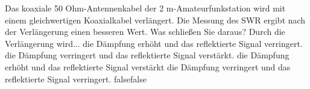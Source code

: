     {Das koaxiale 50 Ohm-Antennenkabel der 2 m-Amateurfunkstation wird mit einem gleichwertigen Koaxialkabel verlängert. Die Messung des SWR ergibt nach der Verlängerung einen besseren Wert. Was schließen Sie daraus? Durch die Verlängerung wird...}
    {die Dämpfung erhöht und das reflektierte Signal verringert.}
    {die Dämpfung verringert und das reflektierte Signal verstärkt.}
    {die Dämpfung erhöht und das reflektierte Signal verstärkt}
    {die Dämpfung verringert und das reflektierte Signal verringert.}
    {false}{false}